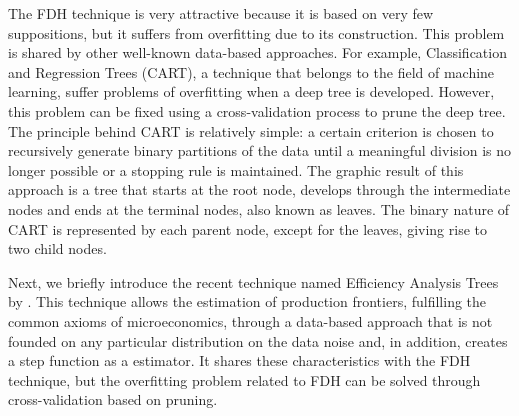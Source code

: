 The FDH technique is very attractive because it is based on very few
suppositions, but it suffers from overfitting due to its construction.
This problem is shared by other well-known data-based approaches. For
example, Classification and Regression Trees (CART), a technique that
belongs to the field of machine learning, suffer problems of overfitting
when a deep tree is developed. However, this problem can be fixed using
a cross-validation process to prune the deep tree. The principle behind
CART is relatively simple: a certain criterion is chosen to recursively
generate binary partitions of the data until a meaningful division is no
longer possible or a stopping rule is maintained. The graphic result of
this approach is a tree that starts at the root node, develops through
the intermediate nodes and ends at the terminal nodes, also known as
leaves. The binary nature of CART is represented by each parent node,
except for the leaves, giving rise to two child nodes.

Next, we briefly introduce the recent technique named Efficiency
Analysis Trees by \citet{esteve2020}. This technique allows the
estimation of production frontiers, fulfilling the common axioms of
microeconomics, through a data-based approach that is not founded on any
particular distribution on the data noise and, in addition, creates a
step function as a estimator. It shares these characteristics with the
FDH technique, but the overfitting problem related to FDH can be solved
through cross-validation based on pruning.


